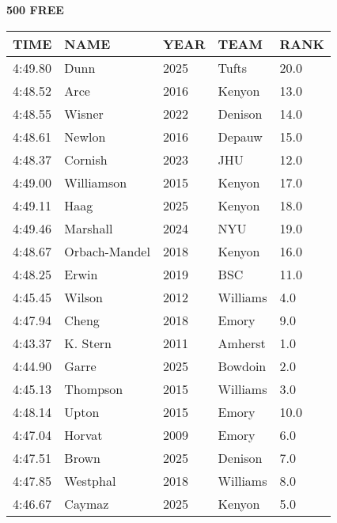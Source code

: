 \begin{minipage}[t]{0.48\textwidth}
\centering
\textbf{500 FREE}\\[0.05cm]
\begin{tabular}{@{}p{1.8cm}p{2.8cm}p{1.2cm}p{1.4cm}p{0.8cm}@{}}
\hline
\textbf{TIME} & \textbf{NAME} & \textbf{YEAR} & \textbf{TEAM} & \textbf{RANK} \\
\hline
4:49.80 & Dunn & 2025 & Tufts & 20.0 \\
4:48.52 & Arce & 2016 & Kenyon & 13.0 \\
4:48.55 & Wisner & 2022 & Denison & 14.0 \\
4:48.61 & Newlon & 2016 & Depauw & 15.0 \\
4:48.37 & Cornish & 2023 & JHU & 12.0 \\
4:49.00 & Williamson & 2015 & Kenyon & 17.0 \\
4:49.11 & Haag & 2025 & Kenyon & 18.0 \\
4:49.46 & Marshall & 2024 & NYU & 19.0 \\
4:48.67 & Orbach-Mandel & 2018 & Kenyon & 16.0 \\
4:48.25 & Erwin & 2019 & BSC & 11.0 \\
4:45.45 & Wilson & 2012 & Williams & 4.0 \\
4:47.94 & Cheng & 2018 & Emory & 9.0 \\
4:43.37 & K. Stern & 2011 & Amherst & 1.0 \\
4:44.90 & Garre & 2025 & Bowdoin & 2.0 \\
4:45.13 & Thompson & 2015 & Williams & 3.0 \\
4:48.14 & Upton & 2015 & Emory & 10.0 \\
4:47.04 & Horvat & 2009 & Emory & 6.0 \\
4:47.51 & Brown & 2025 & Denison & 7.0 \\
4:47.85 & Westphal & 2018 & Williams & 8.0 \\
4:46.67 & Caymaz & 2025 & Kenyon & 5.0 \\
\hline
\end{tabular}
\end{minipage}

\vspace{0.4cm}

